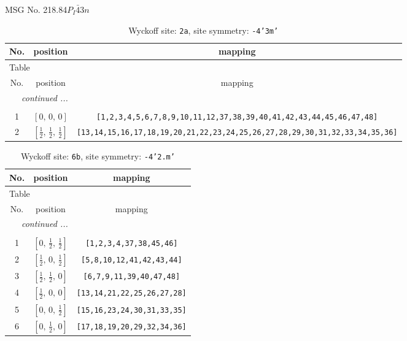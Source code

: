 \documentclass[fleqn,8pt]{jsarticle}
\begin{document}
\setcounter{MaxMatrixCols}{32}

\renewcommand{\tablename}{Table~}
\renewcommand{\figurename}{Figure~}
\begin{center}
\LARGE
MSG No. 218.84\quad$P_{I}\bar{4}3n$
\end{center}
\renewcommand{\arraystretch}{1.2}
\begin{longtable}{ccc}
\caption{Wyckoff site: {\tt 2a}, site symmetry: {\tt -4'3m'}}
 \\
 \hline \hline
No. & position & mapping \\ \hline \endfirsthead

\multicolumn{2}{l}{\tablename\ \thetable{}} \\
 \hline \hline
No. & position & mapping \\ \hline \endhead

 \hline \hline
\multicolumn{2}{r}{\footnotesize\it continued ...} \\ \endfoot

 \hline \hline
\multicolumn{2}{r}{} \\ \endlastfoot

1 & $\left[ 0,\, 0,\, 0 \right]$ & {\tt [1,2,3,4,5,6,7,8,9,10,11,12,37,38,39,40,41,42,43,44,45,46,47,48]} \\ \hline
2 & $\left[ \frac{1}{2},\, \frac{1}{2},\, \frac{1}{2} \right]$ & {\tt [13,14,15,16,17,18,19,20,21,22,23,24,25,26,27,28,29,30,31,32,33,34,35,36]} \\
\end{longtable}
\renewcommand{\arraystretch}{1.2}
\begin{longtable}{ccc}
\caption{Wyckoff site: {\tt 6b}, site symmetry: {\tt -4'2.m'}}
 \\
 \hline \hline
No. & position & mapping \\ \hline \endfirsthead

\multicolumn{2}{l}{\tablename\ \thetable{}} \\
 \hline \hline
No. & position & mapping \\ \hline \endhead

 \hline \hline
\multicolumn{2}{r}{\footnotesize\it continued ...} \\ \endfoot

 \hline \hline
\multicolumn{2}{r}{} \\ \endlastfoot

1 & $\left[ 0,\, \frac{1}{2},\, \frac{1}{2} \right]$ & {\tt [1,2,3,4,37,38,45,46]} \\ \hline
2 & $\left[ \frac{1}{2},\, 0,\, \frac{1}{2} \right]$ & {\tt [5,8,10,12,41,42,43,44]} \\ \hline
3 & $\left[ \frac{1}{2},\, \frac{1}{2},\, 0 \right]$ & {\tt [6,7,9,11,39,40,47,48]} \\ \hline
4 & $\left[ \frac{1}{2},\, 0,\, 0 \right]$ & {\tt [13,14,21,22,25,26,27,28]} \\ \hline
5 & $\left[ 0,\, 0,\, \frac{1}{2} \right]$ & {\tt [15,16,23,24,30,31,33,35]} \\ \hline
6 & $\left[ 0,\, \frac{1}{2},\, 0 \right]$ & {\tt [17,18,19,20,29,32,34,36]} \\
\end{longtable}
\end{document}
